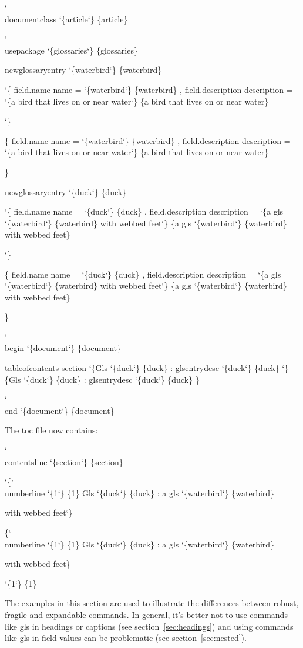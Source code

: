 \documentclass[titlepage=false,fontsize=12pt,captions=tableheading]{scrreprt}
\makeatletter
\newcommand*{\csfmtfont}[1]{\texttt{#1}}
\newcommand*{\styfmt}[1]{\texorpdfstring{\textsf{#1}}{#1}}
\newcommand*{\abbrstylefmt}[1]{\texorpdfstring{\textsf{\color{style}#1}}{#1}}
\newcommand*{\catattrfmt}[1]{\texorpdfstring{\textsf{\color{attribute}#1}}{#1}}
\newcommand*{\counterfmt}[1]{\texorpdfstring{\textsf{#1}}{#1}}
\newcommand*{\marg}[1]{\texorpdfstring
 {\discretionary{}{}{}\char`\{#1\char`\} }%
 {\{#1\}}%
}
\newenvironment{codeenv}
 {%
   \renewcommand{\glslinkpresetkeys}{\setkeys{glslink}{noindex}}%
   \def\cmd{\char`\\}%
   \def\comment##1{\textcolor{comment}{\%\ ##1}}%
   \renewcommand*{\styfmt}[1]{##1}%
   \renewcommand*{\counterfmt}[1]{##1}%
   \renewcommand*{\catattrfmt}[1]{\textcolor{attribute}{##1}}%
   \renewcommand*{\abbrstylefmt}[1]{\textcolor{style}{##1}}%
   \renewcommand*{\csfmtfont}[1]{\textcolor{cs}{##1}}%
    \begin{flushleft}\textcolor{lightgray}{\hrulefill}\par\nopagebreak
     \medskip\nopagebreak
     \ttfamily\obeylines\frenchspacing\@vobeyspaces}
 {\nopagebreak\textcolor{lightgray}{\hrulefill}%
  \end{flushleft}\ignorespacesafterend}
\newcommand{\idx}{\gls}
\newcommand{\ext}{\gls}
\newcommand*{\field}[1]{%
 \texorpdfstring
 {\gls{field.#1}}%
 {#1}%
}
\newlength\borderedboxwidth
\newenvironment{important}{%
  \setlength{\fboxrule}{4pt}%
  \setlength\borderedboxwidth{\linewidth}%
  \addtolength\borderedboxwidth{-2\fboxsep}%
  \addtolength\borderedboxwidth{-2\fboxrule}%
  \begin{lrbox}{\borderedboxcontents}%
    \begin{minipage}{\borderedboxwidth}%
    \raggedright
    \setlength\parindent{1em}%
    \noindent\ignorespaces
}%
{%
    \end{minipage}%
  \end{lrbox}%
  \par\vskip10pt\noindent
  \fcolorbox{red}{white}{\usebox{\borderedboxcontents}}\par\vskip10pt
  \noindent\ignorespacesafterend
}
\newcommand*{\sectionref}[1]{section~\ref{#1}}
\let\texorpdfstring\@secondoftwo
\makeatother
\begin{document}
\begin{codeenv}
\cmd{documentclass}\marg{article}
\strut
\cmd{usepackage}\marg{glossaries}
\strut
\gls{newglossaryentry}\marg{waterbird}
\marg{
  \field{name}=\marg{waterbird},
  \field{description}=\marg{a bird that lives on or near water}
}
\strut
\gls{newglossaryentry}\marg{duck}
\marg{
  \field{name}=\marg{duck},
  \field{description}=\marg{a \gls{gls}\marg{waterbird} with webbed feet}
}
\strut
\cmd{begin}\marg{document}
\gls{tableofcontents}
\gls{section}\marg{\gls{Gls}\marg{duck}: \gls{glsentrydesc}\marg{duck}}
\cmd{end}\marg{document}
\end{codeenv}
The \ext{toc} file now contains:
\begin{codeenv}
\cmd{contentsline} \marg{section}\marg{\cmd{numberline} \marg{1}\gls{Gls} \marg{duck}: a \gls{gls} \marg{waterbird} 
with webbed feet}\marg{1}
\end{codeenv}

\begin{important}
The examples in this section are used to illustrate the differences
between \idx{robust}, \idx{fragile} and \idx{expandable} commands.
In general, it's better not to use commands like \gls{gls} in
headings or captions (see \sectionref{sec:headings}) and using
commands like \gls{gls} in field values can be problematic (see
\sectionref{sec:nested}).
\end{important}
\end{document}
